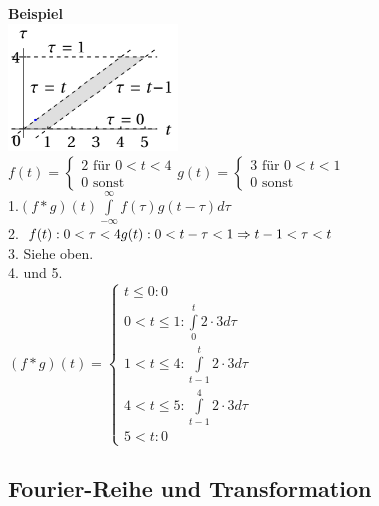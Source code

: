 \begin{multicols}{2}
  \textbf{Beispiel}
  \\\includegraphics[width = 4.5cm]{include/Integraltransformationen/img/Bsp_Grenzen.png}
  \\$f(t)= \begin{cases}
    2 \textrm{ für } 0 <t<4 \\
    0 \textrm{ sonst}
  \end{cases}
  g(t) = \begin{cases}
    3 \textrm{ für } 0<t<1 \\
    0 \textrm{ sonst}
  \end{cases}$
    \\1.$(f * g)(t) \int \limits _{-\infty} ^{\infty} f(\tau)g(t-\tau)d\tau$
    \\2.  $
  f(t): 0<\tau<4 \\
  g(t): 0<t-\tau<1 \Rightarrow t-1 < \tau < t
  $
    \\3. Siehe oben.
    \\4. und 5.
    \\ $(f*g)(t) = \begin{cases}
    t \leq 0: 0
    \\0 < t \leq 1: \int \limits _0 ^t 2 \cdot 3 d\tau
    \\1<t \leq 4: \int \limits _{t-1} ^t 2\cdot 3 d\tau
    \\4 <t \leq 5: \int \limits _{t-1} ^4 2\cdot 3 d\tau
    \\5< t: 0
  \end{cases}$
\end{multicols}


\subsection{Fourier-Reihe und Transformation}
